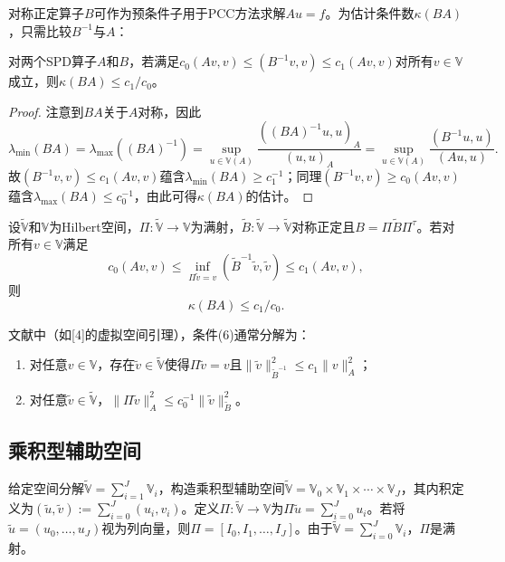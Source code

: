 \documentclass[letterpaper,12pt]{article}
\begin{document}
对称正定算子$B$可作为预条件子用于PCC方法求解$Au=f$。为估计条件数$\kappa(BA)$，只需比较$B^{-1}$与$A$：

\begin{lemma}[2.2]
对两个SPD算子$A$和$B$，若满足$c_{0}(Av,v) \leq (B^{-1}v,v) \leq c_{1}(Av,v)$对所有$v\in\mathbb{\mathbb{V}}$成立，则$\kappa(BA) \leq c_{1}/c_{0}$。
\end{lemma}

\begin{proof}
注意到$BA$关于$A$对称，因此
\[
\lambda_{\min}(BA) = \lambda_{\max}((BA)^{-1}) = \sup_{u \in \mathbb{V}(A)} \frac{((BA)^{-1}u, u)_A}{(u, u)_A} = \sup_{u \in \mathbb{V}(A)} \frac{(B^{-1}u, u)}{(Au, u)}.
\]
故$(B^{-1}v, v) \leq c_1(Av, v)$蕴含$\lambda_{\min}(BA) \geq c_1^{-1}$；同理$(B^{-1}v, v) \geq c_0(Av, v)$蕴含$\lambda_{\max}(BA) \leq c_0^{-1}$，由此可得$\kappa(BA)$的估计。
\end{proof}

\begin{theorem}[2.3]
设$\tilde{\mathbb{V}}$和$\mathbb{V}$为Hilbert空间，$\Pi:\tilde{\mathbb{V}}\to \mathbb{V}$为满射，$\tilde{B}:\tilde{\mathbb{V}}\to\tilde{\mathbb{V}}$对称正定且$B=\Pi\tilde{B}\Pi^\tau$。若对所有$v\in \mathbb{V}$满足
\[
c_0(Av, v) \leq \inf_{\Pi\tilde{v}=v} (\tilde{B}^{-1}\tilde{v}, \tilde{v}) \leq c_1(Av, v),
\]
则
\[
\kappa(BA) \leq c_1/c_0.
\]
\end{theorem}

\begin{remark}[2.4]
文献中（如[4]的虚拟空间引理），条件(6)通常分解为：
\begin{enumerate}
    \item 对任意$v\in \mathbb{V}$，存在$\tilde{v}\in\tilde{\mathbb{V}}$使得$\Pi\tilde{v}=v$且$\|\tilde{v}\|_{\tilde{B}^{-1}}^2 \leq c_1 \|v\|_A^2$；
    \item 对任意$\tilde{v}\in\tilde{\mathbb{V}}$，$\|\Pi\tilde{v}\|_A^2 \leq c_0^{-1}\|\tilde{v}\|_{\tilde{B}}^2$。
\end{enumerate}
\end{remark}

\subsection{乘积型辅助空间}
给定空间分解$\tilde{\mathbb{V}}=\sum_{i=1}^J \mathbb{V}_i$，构造乘积型辅助空间$\tilde{\mathbb{V}}=\mathbb{V}_0\times \mathbb{V}_1\times\cdots\times \mathbb{V}_J$，其内积定义为$(\tilde{u},\tilde{v}):=\sum_{i=0}^J(u_i,v_i)$。定义$\Pi:\tilde{\mathbb{V}}\to \mathbb{V}$为$\Pi\tilde{u}=\sum_{i=0}^J u_i$。若将$\tilde{u}=(u_0,\ldots,u_J)$视为列向量，则$\Pi=[I_0,I_1,\ldots,I_J]$。由于$\tilde{\mathbb{V}}=\sum_{i=0}^J \mathbb{V}_i$，$\Pi$是满射。
\end{document}
